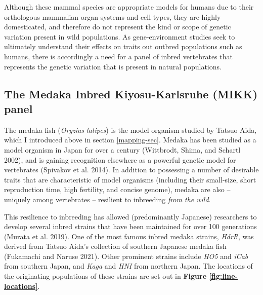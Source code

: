 \documentclass[
]{book}
\begin{document}
Although these mammal species are appropriate models for humans due to their orthologous mammalian organ systems and cell types, they are highly domesticated, and therefore do not represent the kind or scope of genetic variation present in wild populations. As gene-environment studies seek to ultimately understand their effects on traits out outbred populations such as humans, there is accordingly a need for a panel of inbred vertebrates that represents the genetic variation that is present in natural populations.

\hypertarget{MIKK-background}{%
\subsection{The Medaka Inbred Kiyosu-Karlsruhe (MIKK) panel}\label{MIKK-background}}

The medaka fish (\emph{Oryzias latipes}) is the model organism studied by Tatsuo Aida, which I introduced above in section \ref{mapping-sec}. Medaka has been studied as a model organism in Japan for over a century (Wittbrodt, Shima, and Schartl 2002), and is gaining recognition elsewhere as a powerful genetic model for vertebrates (Spivakov et al. 2014). In addition to possessing a number of desirable traits that are characteristic of model organisms (including their small-size, short reproduction time, high fertility, and concise genome), medaka are also -- uniquely among vertebrates -- resilient to inbreeding \emph{from the wild}.

This resilience to inbreeding has allowed (predominantly Japanese) researchers to develop several inbred strains that have been maintained for over 100 generations (Murata et al. 2019). One of the most famous inbred medaka strains, \emph{HdrR}, was derived from Tatsuo Aida's collection of southern Japanese medaka fish (Fukamachi and Naruse 2021). Other prominent strains include \emph{HO5} and \emph{iCab} from southern Japan, and \emph{Kaga} and \emph{HNI} from northern Japan. The locations of the originating populations of these strains are set out in \textbf{Figure \ref{fig:line-locations}}.
\end{document}
